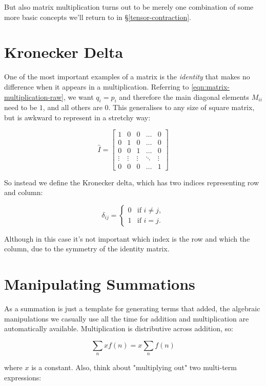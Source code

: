 But also matrix multiplication turns out to be merely one combination of some more basic concepts we'll return to in §\ref{tensor-contraction}.

\section{Kronecker Delta} \label{def:Kronecker}

One of the most important examples of a matrix is the \textit{identity} that makes no difference when it appears in a multiplication. Referring to \eqref{eqn:matrix-multiplication-raw}, we want $q_i = p_i$ and therefore the main diagonal elements $M_{ii}$ need to be $1$, and all others are $0$. This generalises to any size of square matrix, but is awkward to represent in a stretchy way:

$$
\hat{I} = \begin{bmatrix}
1 & 0 & 0 & \dots & 0 \\
0 & 1 & 0 & \dots & 0 \\
0 & 0 & 1 & \dots & 0 \\
\vdots & \vdots & \vdots & \ddots & \vdots\\
0 & 0 & 0 & \dots & 1
\end{bmatrix}
$$

So instead we define the Kronecker delta, which has two indices representing row and column:

$$
\delta_{ij} = \begin{cases}
0 &\text{if } i \neq j,   \\
1 &\text{if } i=j.   \end{cases}
$$

Although in this case it's not important which index is the row and which the column, due to the symmetry of the identity matrix.

\section{Manipulating Summations}

As a summation is just a template for generating terms that added, the algebraic manipulations we casually use all the time for addition and multiplication are automatically available. Multiplication is distributive across addition, so:

$$
\sum_{n} x f(n) = x \sum_{n} f(n)
$$

where $x$ is a constant. Also, think about "multiplying out" two multi-term expressions:

